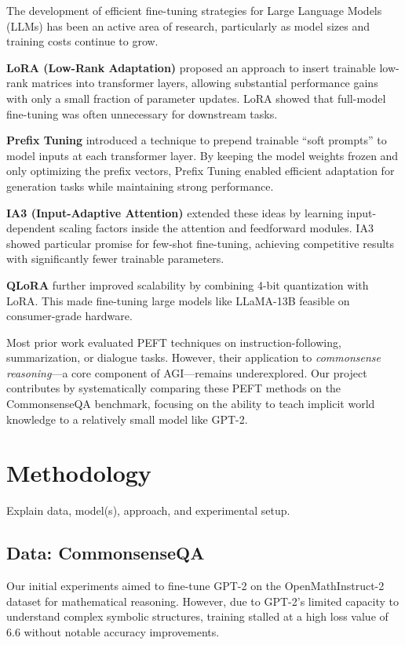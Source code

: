 \documentclass[11pt,twocolumn]{article}
\begin{document}
The development of efficient fine-tuning strategies for Large Language Models (LLMs) has been an active area of research, particularly as model sizes and training costs continue to grow.

\textbf{LoRA (Low-Rank Adaptation)} \citep{hu2022lora} proposed an approach to insert trainable low-rank matrices into transformer layers, allowing substantial performance gains with only a small fraction of parameter updates. LoRA showed that full-model fine-tuning was often unnecessary for downstream tasks.

\textbf{Prefix Tuning} \citep{li2021prefix} introduced a technique to prepend trainable “soft prompts” to model inputs at each transformer layer. By keeping the model weights frozen and only optimizing the prefix vectors, Prefix Tuning enabled efficient adaptation for generation tasks while maintaining strong performance.

\textbf{IA3 (Input-Adaptive Attention)} \citep{liu2022fewshot} extended these ideas by learning input-dependent scaling factors inside the attention and feedforward modules. IA3 showed particular promise for few-shot fine-tuning, achieving competitive results with significantly fewer trainable parameters.

\textbf{QLoRA} \citep{dettmers2023qlora} further improved scalability by combining 4-bit quantization with LoRA. This made fine-tuning large models like LLaMA-13B feasible on consumer-grade hardware.

Most prior work evaluated PEFT techniques on instruction-following, summarization, or dialogue tasks. However, their application to \textit{commonsense reasoning}—a core component of AGI—remains underexplored. Our project contributes by systematically comparing these PEFT methods on the CommonsenseQA benchmark, focusing on the ability to teach implicit world knowledge to a relatively small model like GPT-2.



\section{Methodology}
\label{sec:methodology}
Explain data, model(s), approach, and experimental setup.

\subsection{Data: CommonsenseQA}
Our initial experiments aimed to fine-tune GPT-2 on the OpenMathInstruct-2 dataset for mathematical reasoning. However, due to GPT-2's limited capacity to understand complex symbolic structures, training stalled at a high loss value of 6.6 without notable accuracy improvements.
\end{document}
